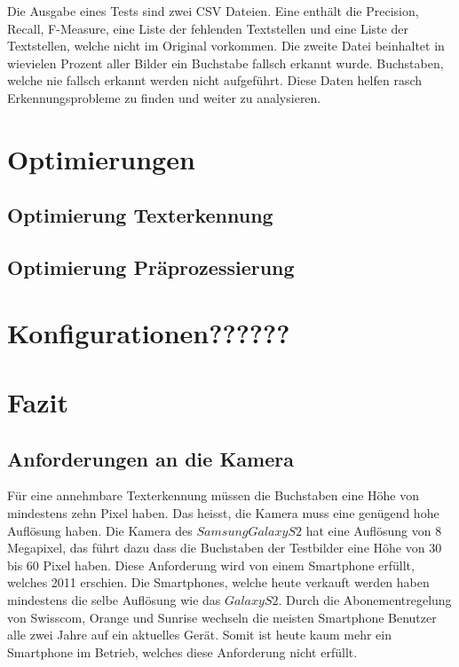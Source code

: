 \documentclass[10pt]{article}
\begin{document}
Die Ausgabe eines Tests sind zwei CSV Dateien. Eine enthält die Precision, Recall, F-Measure, eine Liste der fehlenden Textstellen und eine Liste der Textstellen, welche nicht im Original vorkommen.
Die zweite Datei beinhaltet in wievielen Prozent aller Bilder ein Buchstabe fallsch erkannt wurde. Buchstaben, welche nie fallsch erkannt werden nicht aufgeführt. Diese Daten helfen rasch Erkennungsprobleme zu finden und weiter zu analysieren.

\section{Optimierungen}

\subsection{Optimierung Texterkennung}

\subsection{Optimierung Präprozessierung}


\section{Konfigurationen??????}

\section{Fazit}

\subsection{Anforderungen an die Kamera}
Für eine annehmbare Texterkennung müssen die Buchstaben eine Höhe von mindestens zehn Pixel haben. Das heisst, die Kamera muss eine genügend hohe Auflösung haben. Die Kamera des $Samsung Galaxy S2$ hat eine Auflösung von 8 Megapixel, das führt dazu dass die Buchstaben der Testbilder eine Höhe von 30 bis 60 Pixel haben. Diese Anforderung wird von einem Smartphone erfüllt, welches 2011 erschien. Die Smartphones, welche heute verkauft werden haben mindestens die selbe Auflösung wie das $Galaxy S2$. Durch die Abonementregelung von Swisscom, Orange und Sunrise wechseln die meisten Smartphone Benutzer alle zwei Jahre auf ein aktuelles Gerät. Somit ist heute kaum mehr ein Smartphone im Betrieb, welches diese Anforderung nicht erfüllt.
\end{document}
